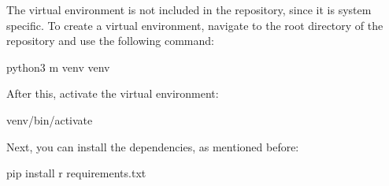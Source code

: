 \documentclass[letterpaper,10pt,english]{sphinxmanual}
\begin{document}
\begin{fulllineitems}
\sphinxAtStartPar
The virtual environment is not included in the repository, since it is system specific. To create a virtual environment, navigate to the root directory of the repository and use the following command:

\begin{sphinxVerbatim}[commandchars=\\\{\}]
python3 \PYGZhy{}m venv venv
\end{sphinxVerbatim}

\sphinxAtStartPar
After this, activate the virtual environment:

\begin{sphinxVerbatim}[commandchars=\\\{\}]
 venv/bin/activate
\end{sphinxVerbatim}

\sphinxAtStartPar
Next, you can install the dependencies, as mentioned before:

\begin{sphinxVerbatim}[commandchars=\\\{\}]
pip install \PYGZhy{}r requirements.txt
\end{sphinxVerbatim}

\end{fulllineitems}
\end{document}
